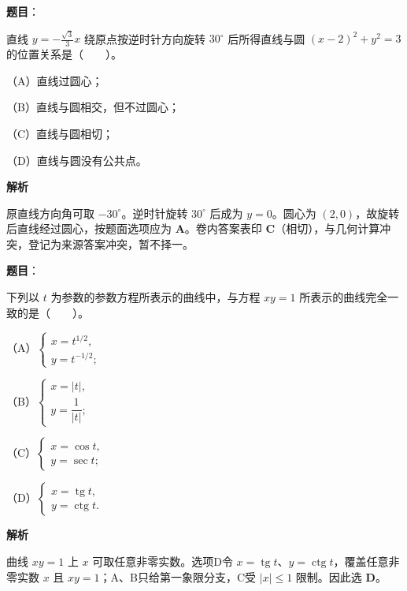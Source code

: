\begin{answer}

\textbf{题目}：

直线 $y=-\frac{\sqrt3}{3}x$ 绕原点按逆时针方向旋转 $30^\circ$ 后所得直线与圆 $(x-2)^2+y^2=3$ 的位置关系是\mbox{（　　）}。

（A）直线过圆心；

（B）直线与圆相交，但不过圆心；

（C）直线与圆相切；

（D）直线与圆没有公共点。

\textbf{解析}

原直线方向角可取 $-30^\circ$。逆时针旋转 $30^\circ$ 后成为 $y=0$。圆心为 $(2,0)$，故旋转后直线经过圆心，按题面选项应为 \textbf{A}。卷内答案表印 \textbf{C}（相切），与几何计算冲突，登记为来源答案冲突，暂不择一。


\end{answer}
\begin{answer}

\textbf{题目}：

下列以 $t$ 为参数的参数方程所表示的曲线中，与方程 $xy=1$ 所表示的曲线完全一致的是\mbox{（　　）}。

（A）$\begin{cases}x=t^{1/2},\\y=t^{-1/2};\end{cases}$

（B）$\begin{cases}x=|t|,\\y=\dfrac1{|t|};\end{cases}$

（C）$\begin{cases}x=\cos t,\\y=\sec t;\end{cases}$

（D）$\begin{cases}x=\operatorname{tg}t,\\y=\operatorname{ctg}t.\end{cases}$

\textbf{解析}

曲线 $xy=1$ 上 $x$ 可取任意非零实数。选项D令 $x=\operatorname{tg}t$、$y=\operatorname{ctg}t$，覆盖任意非零实数 $x$ 且 $xy=1$；A、B只给第一象限分支，C受 $|x|\le1$ 限制。因此选 \textbf{D}。


\end{answer}
